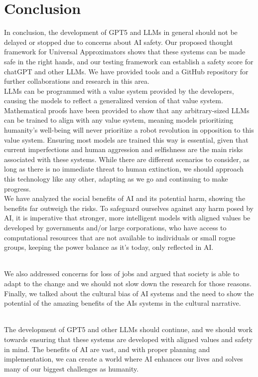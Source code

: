 \documentclass{article}
\begin{document}
\section{Conclusion}
In conclusion, the development of GPT5 and LLMs in general should not be delayed or stopped due to concerns about AI safety. Our proposed thought framework for Universal Approximators shows that these systems can be made safe in the right hands, and our testing framework can establish a safety score for chatGPT and other LLMs. We have provided tools and a GitHub repository\cite{simkin2023} for further collaborations and research in this area.\\

LLMs can be programmed with a value system provided by the developers, causing the models to reflect a generalized version of that value system. Mathematical proofs have been provided to show that any arbitrary-sized LLMs can be trained to align with any value system, meaning models prioritizing humanity's well-being will never prioritize a robot revolution in opposition to this value system. Ensuring most models are trained this way is essential, given that current imperfections and human aggression and selfishness are the main risks associated with these systems. While there are different scenarios to consider, as long as there is no immediate threat to human extinction, we should approach this technology like any other, adapting as we go and continuing to make progress.\\

We have analyzed the social benefits of AI and its potential harm, showing the benefits far outweigh the risks. To safeguard ourselves against any harm posed by AI, it is imperative that stronger, more intelligent models with aligned values be developed by governments and/or large corporations, who have access to computational resources that are not available to individuals or small rogue groups, keeping the power balance as it's today, only reflected in AI. \\\

We also addressed concerns for loss of jobs and argued that society is able to adapt to the change and we should not slow down the research for those reasons. Finally, we talked about the cultural bias of AI systems and the need to show the potential of the amazing benefits of the AIs systems in the cultural narrative.\\\

The development of GPT5 and other LLMs should continue, and we should work towards ensuring that these systems are developed with aligned values and safety in mind. The benefits of AI are vast, and with proper planning and implementation, we can create a world where AI enhances our lives and solves many of our biggest challenges as humanity.\\



\end{document}
